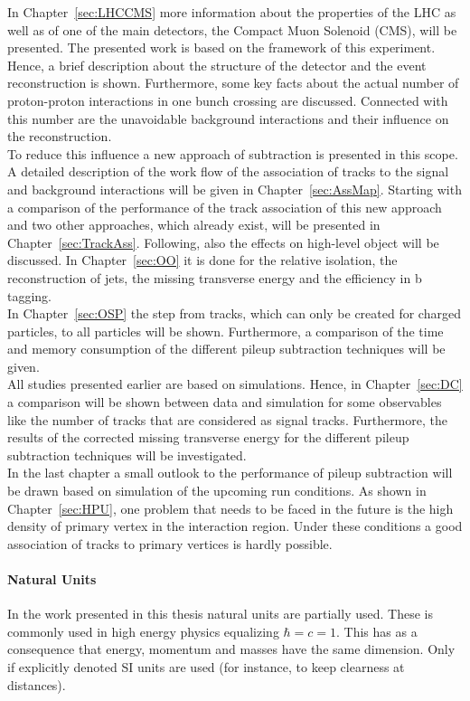 In Chapter~\ref{sec:LHCCMS} more information about the properties of the LHC as well as of one of the main detectors, the Compact Muon Solenoid (CMS), will be presented. The presented work is based on the framework of this experiment. Hence, a brief description about the structure of the detector and the event reconstruction is shown. Furthermore, some key facts about the actual number of proton-proton interactions in one bunch crossing are discussed. Connected with this number are the unavoidable background interactions and their influence on the reconstruction. \\
To reduce this influence a new approach of subtraction is presented in this scope. A detailed description of the work flow of the association of tracks to the signal and background interactions will be given in Chapter~\ref{sec:AssMap}. Starting with a comparison of the performance of the track association of this new approach and two other approaches, which already exist, will be presented in Chapter~\ref{sec:TrackAss}. Following, also the effects on high-level object will be discussed. In Chapter~\ref{sec:OO} it is done for the relative isolation, the reconstruction of jets, the missing transverse energy and the efficiency in b tagging. \\
In Chapter~\ref{sec:OSP} the step from tracks, which can only be created for charged particles, to all particles will be shown. Furthermore, a comparison of the time and memory consumption of the different pileup subtraction techniques will be given. \\
All studies presented earlier are based on simulations. Hence, in Chapter~\ref{sec:DC} a comparison will be shown between data and simulation for some observables like the number of tracks that are considered as signal tracks. Furthermore, the results of the corrected missing transverse energy for the different pileup subtraction techniques will be investigated. \\
In the last chapter a small outlook to the performance of pileup subtraction will be drawn based on simulation of the upcoming run conditions. As shown in Chapter~\ref{sec:HPU}, one problem that needs to be faced in the future is the high density of primary vertex in the interaction region. Under these conditions a good association of tracks to primary vertices is hardly possible.

\paragraph*{Natural Units}

In the work presented in this thesis natural units are partially used. These is commonly used in high energy physics equalizing $\hbar{} = c = 1$. This has as a consequence that energy, momentum and masses have the same dimension. Only if explicitly denoted SI units are used (for instance, to keep clearness at distances).
